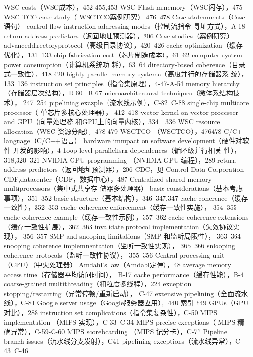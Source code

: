 WSC costs（WSC成本），452-455,453
WSC Flash mmemory（WSC闪存），475
WSC TCO case study（ WSCTCO案例研究）.476~478
Case statemnents（Case语句）
control flow instruction addressing modes（控制流指令
寻址方式），A-18
return address predictors（返回地址预测器），206
Case studies（案例研究）
advanceddirectoryprotocol（高级目录协议），420~426
cache optimization（缓存优化），131~133
chip fabrication cost（芯片制造成本），61~62
computer system power consumption（计算机系统功
耗），63~64
directory-based coberence（目录式一致性），418-420
highly parallel memory systems（高度并行的存储器系
统），133~136
instruction set principles（指令集原理），4-47-A-54
memory hierarchy（存储器层次结构），B-60~-B-67
microarchitectural techniques（微体系结构技术），
247~254
pipelining exazple（流水线示例），C-82~C-88
single-chip multicore processor（ 单芯片多核心处理器），
412~418
vector kernel on vector processor and GPU（向量处理務
和GPU上的向量内核），334~~336
WSC resource allocation（WSC 资源分配），478-479
WSCTCO （WSCTCO），476478
C/C++ language（C/C++语言）
hardware immpact on software development（硬件对软件
开发的影响），4
1oop-level parallelisrn dependences（循环级并行相关
性），318,320~321
NVIDIA GPU programming （NVIDIA GPU 编程），289
return address predictors（返回地址预测器），206
CDC，见 Control Data Corporation
CDF,datacenter（CDF，数据中心），487
Centralized shared-memory multiprocessors（集中式共享存
储器多处理器）
basic considerations（基本考虑事项），351~352
basic structure（基本结构），346~347,347
cache coherence（缓存一致性），352~353
cache coherence enforcement（缓存一致性实施），
354~355
cache coherence example（缓存一致性示例），357~362
cache coherence extensions（缓存一致性扩展），362~363
invalidate protocol implementation（失效协议实现），
356~357
SMP and snooping limitations（SMP 和监听局限性），
363~364
snooping coherence implemnentation（监听一致性实现），
365~366
snlooping coherence protocols（监听一致性协议），
355~356
Central processing unit （CPU）（中央处理器）
Amdahl's law（Amdabl定律），48
average memory access time（存储器平均访问时间），
B-17
cache performance（缓存性能），B-4
coarse-grained multithreading（粗粒度多线程），224
exception stopping/restarting（异常停顿/重新启动），
C-47
extensive pipelining（全面流水线），C-81
Google server usage（Google服务器应用），440
索引
549
GPUs（GPU对比），288
instruction set complications（指令集复杂性），C-50
MIPS implementation （MIPS 实现），C-33~C-34
MIPS precise exceptions（ MIPS 精确异常），C-59-C-60
MIPS scoreboarding （MIPS 记分卡），C-77
Pipeline branch issues（流水线分支发射），C41
pipelining exceptions（流水线异常），C-43~C-46
